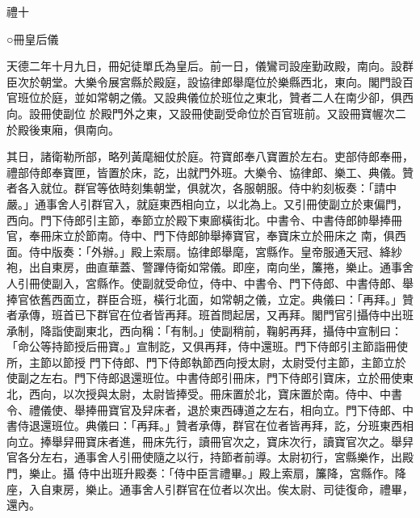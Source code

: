 
\begin{pinyinscope}

 禮十



 ○冊皇后儀



 天德二年十月九日，冊妃徒單氏為皇后。前一日，儀鸞司設座勤政殿，南向。設群臣次於朝堂。大樂令展宮縣於殿庭，設協律郎舉麾位於樂縣西北，東向。閣門設百官班位於庭，並如常朝之儀。又設典儀位於班位之東北，贊者二人在南少卻，俱西向。設冊使副位
 於殿門外之東，又設冊使副受命位於百官班前。又設冊寶幄次二於殿後東廂，俱南向。



 其日，諸衛勒所部，略列黃麾細仗於庭。符寶郎奉八寶置於左右。吏部侍郎奉冊，禮部侍郎奉寶匣，皆置於床，訖，出就門外班。大樂令、協律郎、樂工、典儀。贊者各入就位。群官等依時刻集朝堂，俱就次，各服朝服。侍中約刻板奏：「請中嚴。」通事舍人引群官入，就庭東西相向立，以北為上。又引冊使副立於東偏門，西向。門下侍郎引主節，奉節立於殿下東廊橫街北。中書令、中書侍郎帥舉捧冊官，奉冊床立於節南。侍中、門下侍郎帥舉捧寶官，奉寶床立於冊床之
 南，俱西面。侍中版奏：「外辦。」殿上索扇。協律郎舉麾，宮縣作。皇帝服通天冠、絳紗袍，出自東房，曲直華蓋、警蹕侍衛如常儀。即座，南向坐，簾捲，樂止。通事舍人引冊使副入，宮縣作。使副就受命位，侍中、中書令、門下侍郎、中書侍郎、舉捧官依舊西面立，群臣合班，橫行北面，如常朝之儀，立定。典儀曰：「再拜。」贊者承傳，班首已下群官在位者皆再拜。班首問起居，又再拜。閣門官引攝侍中出班承制，降詣使副東北，西向稱：「有制。」使副稍前，鞠躬再拜，攝侍中宣制曰：「命公等持節授后冊寶。」宣制訖，又俱再拜，侍中還班。門下侍郎引主節詣冊使所，主節以節授
 門下侍郎、門下侍郎執節西向授太尉，太尉受付主節，主節立於使副之左右。門下侍郎退還班位。中書侍郎引冊床，門下侍郎引寶床，立於冊使東北，西向，以次授與太尉，太尉皆捧受。冊床置於北，寶床置於南。侍中、中書令、禮儀使、舉捧冊寶官及舁床者，退於東西磚道之左右，相向立。門下侍郎、中書侍退還班位。典儀曰：「再拜。」贊者承傳，群官在位者皆再拜，訖，分班東西相向立。捧舉舁冊寶床者進，冊床先行，讀冊官次之，寶床次行，讀寶官次之。舉舁官各分左右，通事舍人引冊使隨之以行，持節者前導。太尉初行，宮縣樂作，出殿門，樂止。攝
 侍中出班升殿奏：「侍中臣言禮畢。」殿上索扇，簾降，宮縣作。降座，入自東房，樂止。通事舍人引群官在位者以次出。俟太尉、司徒復命，禮畢，還內。




\end{pinyinscope}
